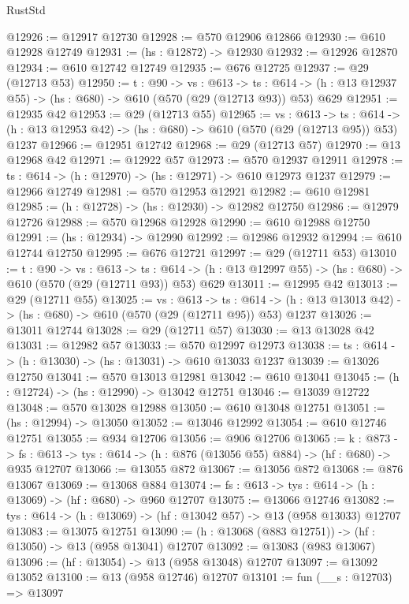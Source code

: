 \begin{lexlean}{RustStd}
\begin{coremodule}
@12926 := @12917 @12730
@12928 := @570 @12906 @12866
@12930 := @610 @12928 @12749
@12931 := (hs : @12872) -> @12930
@12932 := @12926 @12870
@12934 := @610 @12742 @12749
@12935 := @676 @12725
@12937 := @29 (@12713 @53)
@12950 := {t : @90} ->
  {vs : @613} ->
  {ts : @614} -> (h : @13 @12937 @55) -> (hs : @680) -> @610 (@570 (@29 (@12713 @93)) @53) @629
@12951 := @12935 @42
@12953 := @29 (@12713 @55)
@12965 := {vs : @613} ->
  {ts : @614} -> (h : @13 @12953 @42) -> (hs : @680) -> @610 (@570 (@29 (@12713 @95)) @53) @1237
@12966 := @12951 @12742
@12968 := @29 (@12713 @57)
@12970 := @13 @12968 @42
@12971 := @12922 @57
@12973 := @570 @12937 @12911
@12978 := {ts : @614} -> (h : @12970) -> (hs : @12971) -> @610 @12973 @1237
@12979 := @12966 @12749
@12981 := @570 @12953 @12921
@12982 := @610 @12981
@12985 := (h : @12728) -> (hs : @12930) -> @12982 @12750
@12986 := @12979 @12726
@12988 := @570 @12968 @12928
@12990 := @610 @12988 @12750
@12991 := (hs : @12934) -> @12990
@12992 := @12986 @12932
@12994 := @610 @12744 @12750
@12995 := @676 @12721
@12997 := @29 (@12711 @53)
@13010 := {t : @90} ->
  {vs : @613} ->
  {ts : @614} -> (h : @13 @12997 @55) -> (hs : @680) -> @610 (@570 (@29 (@12711 @93)) @53) @629
@13011 := @12995 @42
@13013 := @29 (@12711 @55)
@13025 := {vs : @613} ->
  {ts : @614} -> (h : @13 @13013 @42) -> (hs : @680) -> @610 (@570 (@29 (@12711 @95)) @53) @1237
@13026 := @13011 @12744
@13028 := @29 (@12711 @57)
@13030 := @13 @13028 @42
@13031 := @12982 @57
@13033 := @570 @12997 @12973
@13038 := {ts : @614} -> (h : @13030) -> (hs : @13031) -> @610 @13033 @1237
@13039 := @13026 @12750
@13041 := @570 @13013 @12981
@13042 := @610 @13041
@13045 := (h : @12724) -> (hs : @12990) -> @13042 @12751
@13046 := @13039 @12722
@13048 := @570 @13028 @12988
@13050 := @610 @13048 @12751
@13051 := (hs : @12994) -> @13050
@13052 := @13046 @12992
@13054 := @610 @12746 @12751
@13055 := @934 @12706
@13056 := @906 @12706
@13065 := {k : @873} ->
  {fs : @613} -> {tys : @614} -> (h : @876 (@13056 @55) @884) -> (hf : @680) -> @935 @12707
@13066 := @13055 @872
@13067 := @13056 @872
@13068 := @876 @13067
@13069 := @13068 @884
@13074 := {fs : @613} -> {tys : @614} -> (h : @13069) -> (hf : @680) -> @960 @12707
@13075 := @13066 @12746
@13082 := {tys : @614} -> (h : @13069) -> (hf : @13042 @57) -> @13 (@958 @13033) @12707
@13083 := @13075 @12751
@13090 := (h : @13068 (@883 @12751)) -> (hf : @13050) -> @13 (@958 @13041) @12707
@13092 := @13083 (@983 @13067)
@13096 := (hf : @13054) -> @13 (@958 @13048) @12707
@13097 := @13092 @13052
@13100 := @13 (@958 @12746) @12707
@13101 := fun (__s : @12703) => @13097

\end{coremodule}
\end{lexlean}
